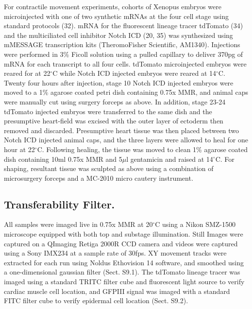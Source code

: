 For contractile movement experiments, cohorts of Xenopus embryos were microinjected with one of two synthetic mRNAs at the four cell stage using standard protocols (32). mRNA for the fluorescent lineage tracer tdTomato (34) and the multiciliated cell inhibitor Notch ICD (20, 35) was synthesized using mMESSAGE transcription kits (TheromoFisher Scientific, AM1340). Injections were performed in 3\% Ficoll solution using a pulled capillary to deliver 370pg of mRNA for each transcript to all four cells. tdTomato microinjected embryos were reared for at 22{$^{\circ}$}C while Notch ICD injected embryos were reared at 14{$^{\circ}$}C. Twenty four hours after injection, stage 10 Notch ICD injected embryos were moved to a 1\% agarose coated petri dish containing 0.75x MMR, and animal caps were manually cut using surgery forceps as above. In addition, stage 23-24 tdTomato injected embryos were transferred to the same dish and the presumptive heart-field was excised with the outer layer of ectoderm then removed and discarded. Presumptive heart tissue was then placed between two Notch ICD injected animal caps, and the three layers were allowed to heal for one hour at 22{$^{\circ}$}C. Following healing, the tissue was moved to clean 1\% agarose coated dish containing 10ml 0.75x MMR and 5{$\mu$}l gentamicin and raised at 14{$^{\circ}$}C. For shaping, resultant tissue was sculpted as above using a combination of microsurgery forceps and a MC-2010 micro cautery instrument.

\subsection*{Transferability Filter.}  

All samples were imaged live in 0.75x MMR at 20{$^{\circ}$}C using a Nikon SMZ-1500 microscope equipped with both top and substage illumination. Still Images were captured on a QImaging Retiga 2000R CCD camera and videos were captured using a Sony IMX234 at a sample rate of 30fps. XY movement tracks were extracted for each run using Noldus Ethovision 14 software, and smoothed using a one-dimensional gaussian filter (Sect. S9.1). The tdTomato lineage tracer was imaged using a standard TRITC filter cube and fluorescent light source to verify cardiac muscle cell location, and GFPIII signal was imaged with a standard FITC filter cube to verify epidermal cell location (Sect. S9.2). 



